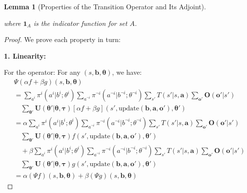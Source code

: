 \documentclass[a4paper,12pt]{report}
\newtheorem{lemma}{Lemma}
\begin{document}
\begin{lemma}[Properties of the Transition Operator and Its Adjoint]
\begin{enumerate}
              where $\mathbf{1}_{A}$ is the indicator function for set $A$.
    \end{enumerate}
\end{lemma}

\begin{proof}
    We prove each property in turn:

    \textbf{1. Linearity:}

    For the operator: For any $(s, \boldsymbol{b}, \boldsymbol{\theta})$, we have:
    \begin{align}
         & \Psi(\alpha f + \beta g)(s, \boldsymbol{b}, \boldsymbol{\theta})                                                                                                                                                            \\
         & = \sum_{a^i}\pi^{i}(a^{i}|b^{i}; \theta^{i}) \sum_{a^{\neg i}}\pi^{\neg i}(a^{\neg i}|b^{\neg i}; \theta^{\neg i}) \sum_{s'}T(s'|s, \boldsymbol{a}) \sum_{\boldsymbol{o}'}\boldsymbol{O}(\boldsymbol{o}'|s')                \\
         & \quad \sum_{\boldsymbol{\theta}'}\boldsymbol{U}(\boldsymbol{\theta}'|\boldsymbol{\theta}, \boldsymbol{\tau}) [\alpha f + \beta g](s', \text{update}(\boldsymbol{b}, \boldsymbol{a}, \boldsymbol{o}'), \boldsymbol{\theta}') \\
         & = \alpha \sum_{a^i}\pi^{i}(a^{i}|b^{i}; \theta^{i}) \sum_{a^{\neg i}}\pi^{\neg i}(a^{\neg i}|b^{\neg i}; \theta^{\neg i}) \sum_{s'}T(s'|s, \boldsymbol{a}) \sum_{\boldsymbol{o}'}\boldsymbol{O}(\boldsymbol{o}'|s')         \\
         & \quad \sum_{\boldsymbol{\theta}'}\boldsymbol{U}(\boldsymbol{\theta}'|\boldsymbol{\theta}, \boldsymbol{\tau}) f(s', \text{update}(\boldsymbol{b}, \boldsymbol{a}, \boldsymbol{o}'), \boldsymbol{\theta}')                    \\
         & \quad + \beta \sum_{a^i}\pi^{i}(a^{i}|b^{i}; \theta^{i}) \sum_{a^{\neg i}}\pi^{\neg i}(a^{\neg i}|b^{\neg i}; \theta^{\neg i}) \sum_{s'}T(s'|s, \boldsymbol{a}) \sum_{\boldsymbol{o}'}\boldsymbol{O}(\boldsymbol{o}'|s')    \\
         & \quad \sum_{\boldsymbol{\theta}'}\boldsymbol{U}(\boldsymbol{\theta}'|\boldsymbol{\theta}, \boldsymbol{\tau}) g(s', \text{update}(\boldsymbol{b}, \boldsymbol{a}, \boldsymbol{o}'), \boldsymbol{\theta}')                    \\
         & = \alpha (\Psi f)(s, \boldsymbol{b}, \boldsymbol{\theta}) + \beta (\Psi g)(s, \boldsymbol{b}, \boldsymbol{\theta})
    \end{align}


\end{proof}
\end{document}
